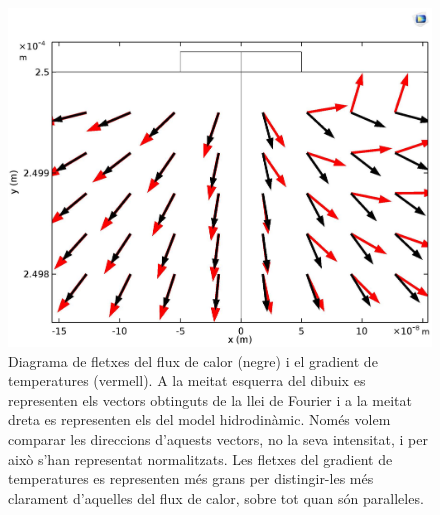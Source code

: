 \documentclass{article}
\begin{document}
\begin{figure}[ht!]
\begin{center}
\includegraphics[scale=0.7]{../grafics/estacionari/temperatura-flux.jpg}
\caption{Diagrama de fletxes del flux de calor (negre) i el gradient de temperatures (vermell). A la meitat esquerra del dibuix es representen els vectors obtinguts de la llei de Fourier i a la meitat dreta es representen els del model hidrodin\`{a}mic. Nom\'{e}s volem comparar les direccions d'aquests vectors, no la seva intensitat, i per aix\`{o} s'han representat normalitzats. Les fletxes del gradient de temperatures es representen m\'{e}s grans per distingir-les m\'{e}s clarament d'aquelles del flux de calor, sobre tot quan s\'{o}n paral\textperiodcentered leles.}
\label{Fig:Fletxes}
\end{center}
\end{figure}
\end{document}
